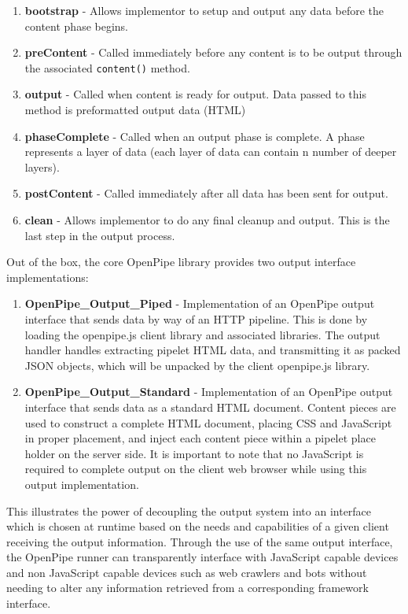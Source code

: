 \documentclass[12pt]{report}
\begin{document}
\begin{enumerate}
	\item \textbf{bootstrap} - Allows implementor to setup and output any data before the content phase begins.
	\item \textbf{preContent} - Called immediately before any content is to be output through the associated \texttt{content()} method. 
	\item \textbf{output} - Called when content is ready for output. Data passed to this method is preformatted output data (HTML)
	\item \textbf{phaseComplete} - Called when an output phase is complete. A phase represents a layer of data (each layer of data can contain n number of deeper layers).
	\item \textbf{postContent} - Called immediately after all data has been sent for output.
	\item \textbf{clean} - Allows implementor to do any final cleanup and output. This is the last step in the output process.
\end{enumerate}

Out of the box, the core OpenPipe library provides two output interface implementations:

\begin{enumerate}
	\item \textbf{OpenPipe\_Output\_Piped} - Implementation of an OpenPipe output interface that sends data by way of an HTTP pipeline. This is done by loading the openpipe.js client library and associated libraries. The output handler handles extracting pipelet HTML data, and transmitting it as packed JSON objects, which will be unpacked by the client openpipe.js library.
	\item \textbf{OpenPipe\_Output\_Standard} - Implementation of an OpenPipe output interface that sends data as a standard HTML document. Content pieces are used to construct a complete HTML document, placing CSS and JavaScript in proper placement, and inject each content piece within a pipelet place holder on the server side. It is important to note that no JavaScript is required to complete output on the client web browser while using this output implementation.
\end{enumerate}

This illustrates the power of decoupling the output system into an interface which is chosen at runtime based on the needs and capabilities of a given client receiving the output information. Through the use of the same output interface, the OpenPipe runner can transparently interface with JavaScript capable devices and non JavaScript capable devices such as web crawlers and bots without needing to alter any information retrieved from a corresponding framework interface.
\end{document}
